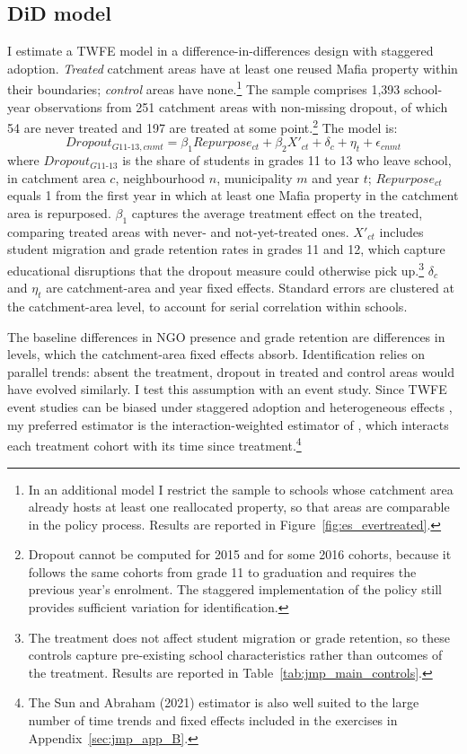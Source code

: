 \documentclass[12pt]{article}
\theoremstyle{plain}
\theoremstyle{plain}
\theoremstyle{plain}
\theoremstyle{definition}
\theoremstyle{plain}
\theoremstyle{definition}
\theoremstyle{plain}
\theoremstyle{remark}
\theoremstyle{definition}
\theoremstyle{definition}
\theoremstyle{plain}
\begin{document}
\subsection{DiD model}
\label{sec:jmp_did_model}
I estimate a TWFE model in a difference-in-differences design with staggered adoption. \emph{Treated} catchment areas have at least one reused Mafia property within their boundaries; \emph{control} areas have none.\footnote{In an additional model I restrict the sample to schools whose catchment area already hosts at least one reallocated property, so that areas are comparable in the policy process. Results are reported in Figure~\ref{fig:es_evertreated}.} The sample comprises 1,393 school-year observations from 251 catchment areas with non-missing dropout, of which 54 are never treated and 197 are treated at some point.\footnote{Dropout cannot be computed for 2015 and for some 2016 cohorts, because it follows the same cohorts from grade 11 to graduation and requires the previous year's enrolment. The staggered implementation of the policy still provides sufficient variation for identification.} The model is:
\begin{equation} \label{1stspec}
 Dropout_{G11\text{-}13,cnmt} = \beta_1 Repurpose_{ct} + \beta_2 X'_{ct} + \delta_c + \eta_t + \epsilon_{cnmt}
\end{equation}
where $Dropout_{G11\text{-}13}$ is the share of students in grades 11 to 13 who leave school, in catchment area $c$, neighbourhood $n$, municipality $m$ and year $t$; $Repurpose_{ct}$ equals 1 from the first year in which at least one Mafia property in the catchment area is repurposed. $\beta_1$ captures the average treatment effect on the treated, comparing treated areas with never- and not-yet-treated ones. $X'_{ct}$ includes student migration and grade retention rates in grades 11 and 12, which capture educational disruptions that the dropout measure could otherwise pick up.\footnote{The treatment does not affect student migration or grade retention, so these controls capture pre-existing school characteristics rather than outcomes of the treatment. Results are reported in Table~\ref{tab:jmp_main_controls}.} $\delta_c$ and $\eta_t$ are catchment-area and year fixed effects. Standard errors are clustered at the catchment-area level, to account for serial correlation within schools. \par
\medskip
The baseline differences in NGO presence and grade retention are differences in levels, which the catchment-area fixed effects absorb. Identification relies on parallel trends: absent the treatment, dropout in treated and control areas would have evolved similarly. I test this assumption with an event study. Since TWFE event studies can be biased under staggered adoption and heterogeneous effects \citep{goodman-bacon_difference--differences_2021, sun_estimating_2021, callaway_difference--differences_2021}, my preferred estimator is the interaction-weighted estimator of \citet{sun_estimating_2021}, which interacts each treatment cohort with its time since treatment.\footnote{The Sun and Abraham (2021) estimator is also well suited to the large number of time trends and fixed effects included in the exercises in Appendix~\ref{sec:jmp_app_B}.} \par
\end{document}
